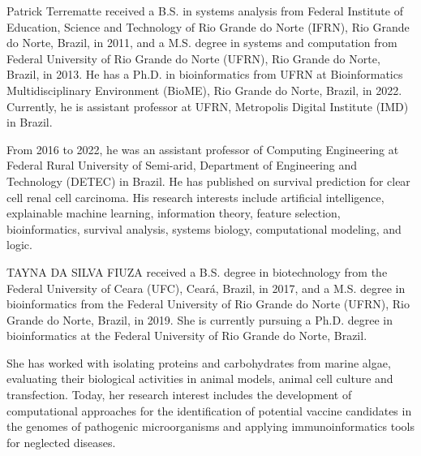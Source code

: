 \documentclass{ieeeaccess}
\begin{document}
\begin{IEEEbiography}{Patrick Terrematte} received a B.S. in systems analysis from Federal Institute of Education, Science and Technology of Rio Grande do Norte (IFRN), Rio Grande do Norte, Brazil, in 2011, and a M.S. degree in systems and computation from Federal University of Rio Grande do Norte (UFRN), Rio Grande do Norte, Brazil, in 2013. He has a Ph.D. in bioinformatics from UFRN at Bioinformatics Multidisciplinary Environment (BioME), Rio Grande do Norte, Brazil, in 2022. Currently, he is assistant professor at UFRN, Metropolis Digital Institute (IMD) in Brazil.

From 2016 to 2022, he was an assistant professor of Computing Engineering at Federal Rural University of Semi-arid, Department of Engineering and Technology (DETEC) in Brazil. He has published on survival prediction for clear cell renal cell carcinoma. His research interests include artificial intelligence, explainable machine learning, information theory, feature selection, bioinformatics, survival analysis, systems biology, computational modeling, and logic.
\end{IEEEbiography}

\begin{IEEEbiography}{TAYNA DA SILVA FIUZA} received a B.S. degree in biotechnology from the Federal University of Ceara (UFC), Ceará, Brazil, in 2017, and a M.S. degree in bioinformatics from the Federal University of Rio Grande do Norte (UFRN), Rio Grande do Norte, Brazil, in 2019. She is currently pursuing a Ph.D. degree in bioinformatics at the Federal University of Rio Grande do Norte, Brazil.

She has worked with isolating proteins and carbohydrates from marine algae, evaluating their biological activities in animal models, animal cell culture and transfection. Today, her research interest includes the development of computational approaches for the identification of potential vaccine candidates in the genomes of pathogenic microorganisms and applying immunoinformatics tools for neglected diseases. 

\end{IEEEbiography}
\end{document}
